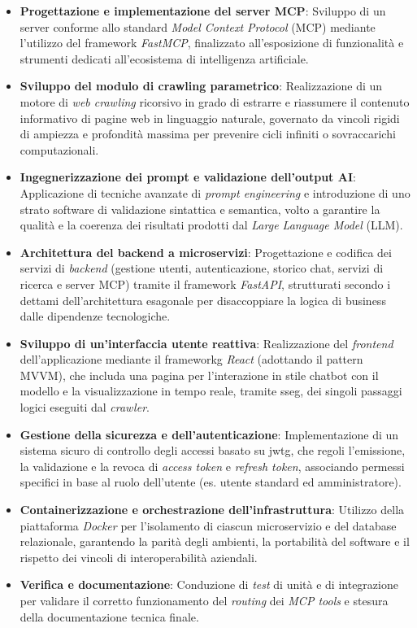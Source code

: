 \begin{itemize}
    \item \textbf{Progettazione e implementazione del server MCP}: Sviluppo di un server conforme allo standard \textit{Model Context Protocol} (MCP) mediante l'utilizzo del framework \textit{FastMCP}, finalizzato all'esposizione di funzionalità e strumenti dedicati all'ecosistema di intelligenza artificiale.
    \item \textbf{Sviluppo del modulo di crawling parametrico}: Realizzazione di un motore di \textit{web crawling} ricorsivo in grado di estrarre e riassumere il contenuto informativo di pagine web in linguaggio naturale, governato da vincoli rigidi di ampiezza e profondità massima per prevenire cicli infiniti o sovraccarichi computazionali.
    \item \textbf{Ingegnerizzazione dei prompt e validazione dell'output AI}: Applicazione di tecniche avanzate di \textit{prompt engineering} e introduzione di uno strato software di validazione sintattica e semantica, volto a garantire la qualità e la coerenza dei risultati prodotti dal \textit{Large Language Model} (LLM).
    \item \textbf{Architettura del backend a microservizi}: Progettazione e codifica dei servizi di \textit{backend} (gestione utenti, autenticazione, storico chat, servizi di ricerca e server MCP) tramite il framework \textit{FastAPI}, strutturati secondo i dettami dell'architettura esagonale per disaccoppiare la logica di business dalle dipendenze tecnologiche.
    \item \textbf{Sviluppo di un'interfaccia utente reattiva}: Realizzazione del \textit{frontend} dell'applicazione mediante il \gls{frameworkg} \textit{React} (adottando il pattern MVVM), che includa una pagina per l'interazione in stile chatbot con il modello e la visualizzazione in tempo reale, tramite \gls{sseg}, dei singoli passaggi logici eseguiti dal \textit{crawler}.
    \item \textbf{Gestione della sicurezza e dell'autenticazione}: Implementazione di un sistema sicuro di controllo degli accessi basato su \gls{jwtg}, che regoli l'emissione, la validazione e la revoca di \textit{access token} e \textit{refresh token}, associando permessi specifici in base al ruolo dell'utente (es. utente standard ed amministratore).
    \item \textbf{Containerizzazione e orchestrazione dell'infrastruttura}: Utilizzo della piattaforma \textit{Docker} per l'isolamento di ciascun microservizio e del database relazionale, garantendo la parità degli ambienti, la portabilità del software e il rispetto dei vincoli di interoperabilità aziendali.
    \item \textbf{Verifica e documentazione}: Conduzione di \textit{test} di unità e di integrazione per validare il corretto funzionamento del \textit{routing} dei \textit{MCP tools} e stesura della documentazione tecnica finale.
\end{itemize}

